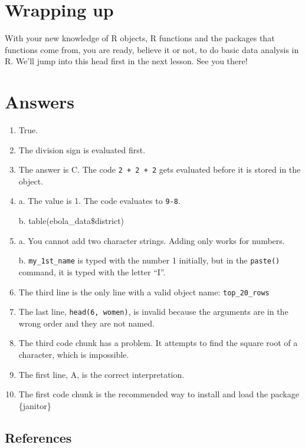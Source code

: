 \documentclass[
  letterpaper,
  DIV=11,
  numbers=noendperiod]{scrreprt}
\begin{document}
\section{Wrapping up}\label{wrapping-up-1}

With your new knowledge of R objects, R functions and the packages that
functions come from, you are ready, believe it or not, to do basic data
analysis in R. We'll jump into this head first in the next lesson. See
you there!

\section{Answers}\label{answers}

\begin{enumerate}
\def\labelenumi{\arabic{enumi}.}
\item
  True.
\item
  The division sign is evaluated first.
\item
  The answer is C. The code \texttt{2\ +\ 2\ +\ 2} gets evaluated before
  it is stored in the object.
\item
  a. The value is 1. The code evaluates to \texttt{9-8}.

  b. table(ebola\_data\$district)
\item
  a. You cannot add two character strings. Adding only works for
  numbers.

  b. \texttt{my\_1st\_name} is typed with the number 1 initially, but in
  the \texttt{paste()} command, it is typed with the letter ``I''.
\item
  The third line is the only line with a valid object name:
  \texttt{top\_20\_rows}
\item
  The last line, \texttt{head(6,\ women)}, is invalid because the
  arguments are in the wrong order and they are not named.
\item
  The third code chunk has a problem. It attempts to find the square
  root of a character, which is impossible.
\item
  The first line, A, is the correct interpretation.
\item
  The first code chunk is the recommended way to install and load the
  package \{janitor\}
\end{enumerate}

\subsection*{References}\label{references-2}
\end{document}
